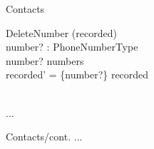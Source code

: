 \documentclass[12pt]{article}
\begin{document}
\begin{spacing}{1.5}
\begin{class}{Contacts}
\begin{op}{DeleteNumber}
\Delta (recorded) \\
number? : PhoneNumberType\\
\ST
number? \in numbers\\
recorded' = \{number?\} \ndres recorded
\end{op}\\

...
\end{class}
\newpage

\begin{class}{Contacts/cont.}
\also
...
\end{class}


\end{spacing}
\end{document}
